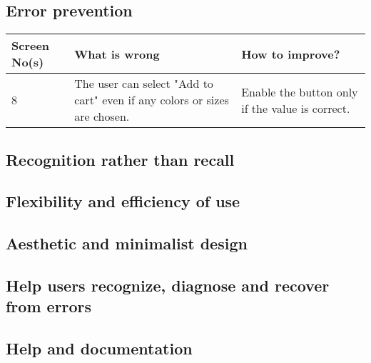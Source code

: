 \documentclass[fontsize=12pt,paper=a4]{scrartcl}
\begin{document}
\subsection{Error prevention}
\begin{table}[htdp]
\begin{center}
\begin{tabular}{|p{2cm}|p{6.5cm}|p{6.5cm}|}
\hline
\textbf{Screen No(s)} & \textbf{What is wrong} & \textbf{How to improve?} \\
\hline
8 & The user can select "Add to cart" even if any colors or sizes are chosen. & Enable the button only if the value is correct.\\
\hline
\end{tabular}
\end{center}
\label{5_heurisitcs_eval}
\end{table}

\subsection{Recognition rather than recall}

\subsection{Flexibility and efficiency of use}

\subsection{Aesthetic and minimalist design}

\subsection{Help users recognize, diagnose and recover from errors}

\subsection{Help and documentation}
\end{document}
